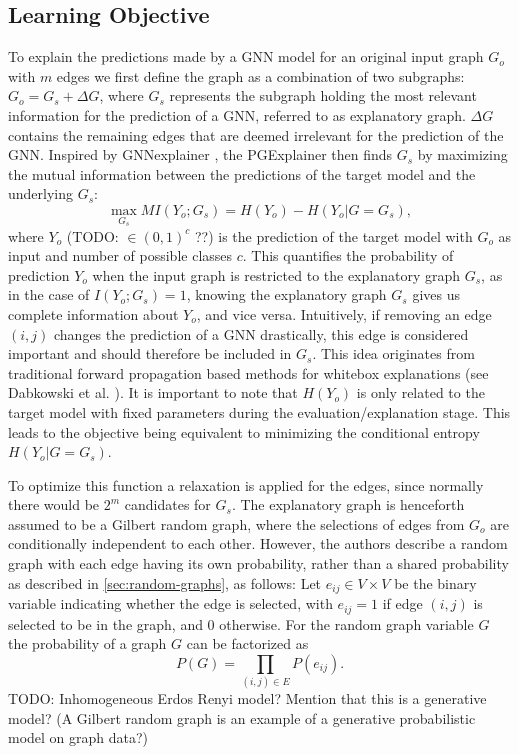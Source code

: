 \subsection{Learning Objective}
\label{sec:learning_objective}
To explain the predictions made by a GNN model for an original input graph $G_o$ with $m$ edges we first define the graph as a combination of two subgraphs: $G_o = G_s + \Delta G$, where $G_s$ represents the subgraph holding the most relevant information for the prediction of a GNN, referred to as explanatory graph. $\Delta G$ contains the remaining edges that are deemed irrelevant for the prediction of the GNN. Inspired by GNNexplainer \cite{ying2019gnnexplainer}, the PGExplainer then finds $G_s$ by maximizing the mutual information between the predictions of the target model and the underlying $G_s$:
\begin{equation}
    \max_{G_s} MI(Y_o;G_s) = H(Y_o) - H(Y_o|G=G_s),
\end{equation} 
where $Y_o$ (TODO: $\in (0,1)^c$ ??) is the prediction of the target model with $G_o$ as input and number of possible classes $c$. This quantifies the probability of prediction $Y_o$ when the input graph is restricted to the explanatory graph $G_s$, as in the case of $I(Y_o;G_s) = 1$, knowing the explanatory graph $G_s$ gives us complete information about $Y_o$, and vice versa. Intuitively, if removing an edge $(i,j)$ changes the prediction of a GNN drastically, this edge is considered important and should therefore be included in $G_s$. This idea originates from traditional forward propagation based methods for whitebox explanations (see Dabkowski et al. \cite{dabkowski2017real}).
It is important to note that $H(Y_o)$ is only related to the target model with fixed parameters during the evaluation/explanation stage. This leads to the objective being equivalent to minimizing the conditional entropy $H(Y_o|G=G_s)$.

To optimize this function a relaxation is applied for the edges, since normally there would be $2^m$ candidates for $G_s$. The explanatory graph is henceforth assumed to be a Gilbert random graph, where the selections of edges from $G_o$ are conditionally independent to each other. However, the authors describe a random graph with each edge having its own probability, rather than a shared probability as described in \ref{sec:random-graphs}, as follows: Let $e_{ij}\in V \times V$ be the binary variable indicating whether the edge is selected, with $e_{ij} = 1$ if edge $(i,j)$ is selected to be in the graph, and 0 otherwise. For the random graph variable $G$ the probability of a graph $G$ can be factorized as 
\begin{equation}
    P(G) = \prod_{(i,j)\in E}P(e_{ij}).
\end{equation}
TODO: Inhomogeneous Erdos Renyi model? Mention that this is a generative model? (A Gilbert random graph is an example of a generative probabilistic model on graph data?)

